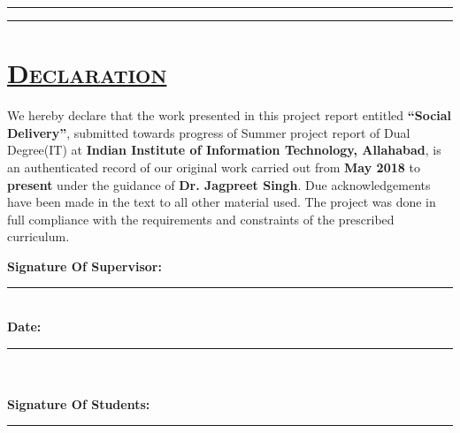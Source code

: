 \documentclass{report}
\begin{document}
\begin{titlepage}
\hfill


	\rule{\textwidth}{0.4pt} %
	
	\vspace{2pt}\vspace{-\baselineskip} %
	
	\rule{\textwidth}{2pt} %
	
\end{titlepage}
\pagebreak


{\chapter*{ \quad \quad \quad \quad \quad \quad  \Huge \scshape \underline {Declaration} }
\vspace{2.0cm}
\begin{spacing}{0.3}
\fontsize{17}{68}\selectfont\linespread{10} {We hereby declare that the work presented in this project report entitled \textbf{``Social Delivery''},  submitted towards progress of Summer project report of Dual Degree(IT) at \textbf{Indian Institute of Information Technology, Allahabad}, is an authenticated record of our original work carried out from \textbf{May 2018} to \textbf{present} under the guidance of \textbf{Dr. Jagpreet Singh}. Due acknowledgements have been made in the text to all other material used. The project was done in full compliance with the requirements and constraints of the prescribed curriculum.}
\end{spacing}
\vspace{3cm}
\Large
\noindent \textbf{Signature Of Supervisor:}\\
\rule[0.5em]{25em}{0.5pt} %
\vspace{1cm}\\
\noindent \textbf{Date:}\\
\rule[0.5em]{25em}{0.5pt}\\ %
\vspace{1cm}\\
\noindent \textbf{Signature Of Students:}\\
\rule[0.5em]{12em}{0.5pt} %
\vspace{1.5cm}\\

}
\end{document}
